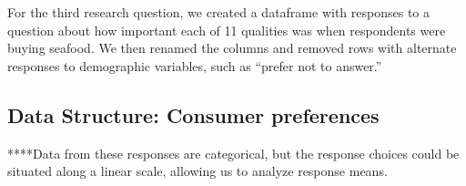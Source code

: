 \documentclass[
  12pt,
]{article}
\begin{document}
For the third research question, we created a dataframe with responses
to a question about how important each of 11 qualities was when
respondents were buying seafood. We then renamed the columns and removed
rows with alternate responses to demographic variables, such as ``prefer
not to answer.''

\hypertarget{data-structure-consumer-preferences}{%
\subsection{Data Structure: Consumer
preferences}\label{data-structure-consumer-preferences}}

****Data from these responses are categorical, but the response choices
could be situated along a linear scale, allowing us to analyze response
means.
\end{document}
